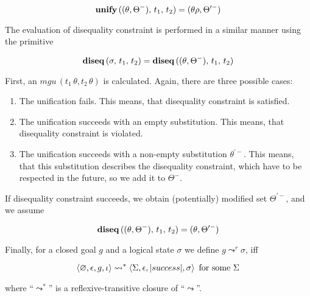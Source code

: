 $$
{\bf unify}\,((\theta,\Theta^-),\,t_1,\,t_2)=(\theta\rho,\Theta^{\prime-})
$$

The evaluation of disequality constraint is performed in a similar manner using the primitive

$$
{\bf diseq}\,(\sigma,\,t_1,\,t_2)={\bf diseq}\,((\theta,\Theta^-),\,t_1,\,t_2)
$$

First, an $mgu\,(t_1\,\theta,t_2\,\theta)$ is calculated. Again, there are three
possible cases:

\begin{enumerate}
\item The unification fails. This means, that disequality constraint is satisfied.
\item The unification succeeds with an empty substitution. This means, that disequality
constraint is violated.
\item The unification succeeds with a non-empty substitution $\theta^{\prime-}$. This means, that 
this substitution describes the disequality constraint, which have to be respected in
the future, so we add it to $\Theta^-$. 
\end{enumerate}

If disequality constraint succeeds, we obtain (potentially) modified set $\Theta^{\prime-}$, and we
assume

$$
{\bf diseq}\,((\theta,\Theta^-),\,t_1,\,t_2)=(\theta,\Theta^{\prime-})
$$

Finally, for a closed goal $g$ and a logical state $\sigma$ we define $g \leadsto^r \sigma$, iff

$$
\inbr{\emptyset,\epsilon,g,\iota}\leadsto^*\inbr{\Sigma,\epsilon,\lstinline|success|,\sigma}\mbox{ for some $\Sigma$}
$$
 
\noindent where ``$\leadsto^*$'' is a reflexive-transitive closure of ``$\leadsto$''. 




